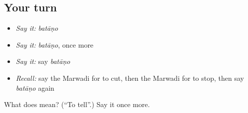 \subsection*{Your turn}
\begin{itemize}
\raggedright
  \item \emph{Say it:} \emph{batāṇo}
  \item \emph{Say it:} \emph{batāṇo}, once more
  \item \emph{Say it:} say \emph{batāṇo}
  \item \emph{Recall:} say the Marwadi for to cut, then the Marwadi for to stop, then say \emph{batāṇo} again
\end{itemize}

\begin{tcolorbox}[breakable,colback=teal!4,colframe=teal!35!black,title={Before you move on}]
What does  mean? (\textquotedblleft{}To tell\textquotedblright{}.) Say it once more.
\end{tcolorbox}
